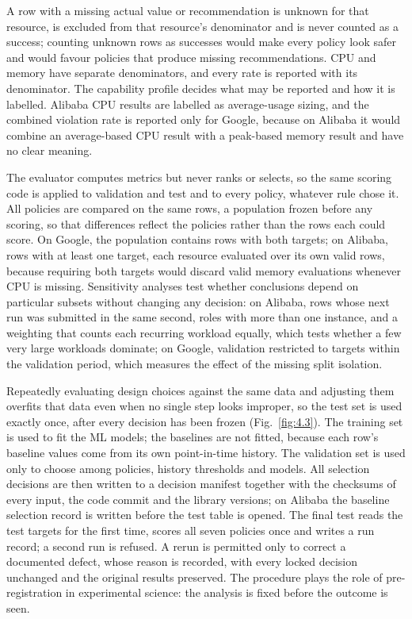 A row with a missing actual value or recommendation is unknown for that resource, is excluded from that resource's denominator and is never counted as a success; counting unknown rows as successes would make every policy look safer and would favour policies that produce missing recommendations. CPU and memory have separate denominators, and every rate is reported with its denominator. The capability profile decides what may be reported and how it is labelled. Alibaba CPU results are labelled as average-usage sizing, and the combined violation rate is reported only for Google, because on Alibaba it would combine an average-based CPU result with a peak-based memory result and have no clear meaning.

The evaluator computes metrics but never ranks or selects, so the same scoring code is applied to validation and test and to every policy, whatever rule chose it. All policies are compared on the same rows, a population frozen before any scoring, so that differences reflect the policies rather than the rows each could score. On Google, the population contains rows with both targets; on Alibaba, rows with at least one target, each resource evaluated over its own valid rows, because requiring both targets would discard valid memory evaluations whenever CPU is missing. Sensitivity analyses test whether conclusions depend on particular subsets without changing any decision: on Alibaba, rows whose next run was submitted in the same second, roles with more than one instance, and a weighting that counts each recurring workload equally, which tests whether a few very large workloads dominate; on Google, validation restricted to targets within the validation period, which measures the effect of the missing split isolation.

Repeatedly evaluating design choices against the same data and adjusting them overfits that data even when no single step looks improper, so the test set is used exactly once, after every decision has been frozen (Fig.~\ref{fig:4.3}). The training set is used to fit the ML models; the baselines are not fitted, because each row's baseline values come from its own point-in-time history. The validation set is used only to choose among policies, history thresholds and models. All selection decisions are then written to a decision manifest together with the checksums of every input, the code commit and the library versions; on Alibaba the baseline selection record is written before the test table is opened. The final test reads the test targets for the first time, scores all seven policies once and writes a run record; a second run is refused. A rerun is permitted only to correct a documented defect, whose reason is recorded, with every locked decision unchanged and the original results preserved. The procedure plays the role of pre-registration in experimental science: the analysis is fixed before the outcome is seen.

